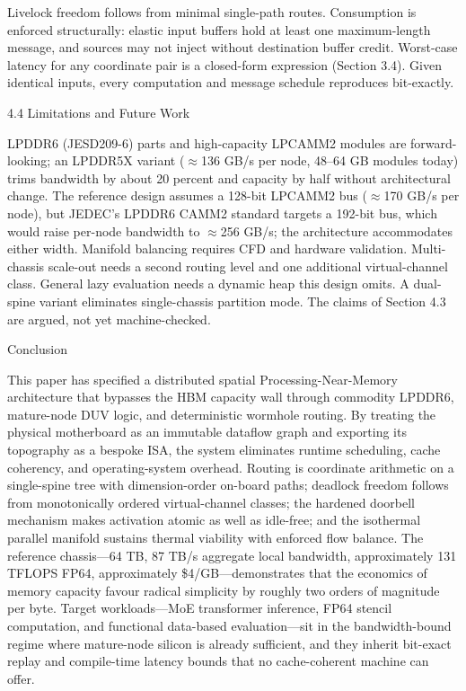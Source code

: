 \documentclass[10pt,twocolumn]{article}
\begin{document}
Livelock freedom follows from minimal single-path routes. Consumption is enforced structurally: elastic input buffers hold at least one maximum-length message, and sources may not inject without destination buffer credit. Worst-case latency for any coordinate pair is a closed-form expression (Section 3.4). Given identical inputs, every computation and message schedule reproduces bit-exactly.

4.4 Limitations and Future Work

LPDDR6 (JESD209-6)\cite{17} parts and high-capacity LPCAMM2 modules are forward-looking; an LPDDR5X variant ($\approx$136 GB/s per node, 48--64 GB modules today) trims bandwidth by about 20 percent and capacity by half without architectural change\cite{16,17}. The reference design assumes a 128-bit LPCAMM2 bus ($\approx$170 GB/s per node), but JEDEC's LPDDR6 CAMM2 standard targets a 192-bit bus, which would raise per-node bandwidth to $\approx$256 GB/s; the architecture accommodates either width. Manifold balancing requires CFD and hardware validation. Multi-chassis scale-out needs a second routing level and one additional virtual-channel class. General lazy evaluation needs a dynamic heap this design omits. A dual-spine variant eliminates single-chassis partition mode. The claims of Section 4.3 are argued, not yet machine-checked\cite{9}.

Conclusion

This paper has specified a distributed spatial Processing-Near-Memory architecture that bypasses the HBM capacity wall through commodity LPDDR6, mature-node DUV logic, and deterministic wormhole routing\cite{13,15,17}. By treating the physical motherboard as an immutable dataflow graph and exporting its topography as a bespoke ISA, the system eliminates runtime scheduling, cache coherency, and operating-system overhead. Routing is coordinate arithmetic on a single-spine tree with dimension-order on-board paths; deadlock freedom follows from monotonically ordered virtual-channel classes; the hardened doorbell mechanism makes activation atomic as well as idle-free; and the isothermal parallel manifold sustains thermal viability with enforced flow balance. The reference chassis---64 TB, 87 TB/s aggregate local bandwidth, approximately 131 TFLOPS FP64, approximately \$4/GB---demonstrates that the economics of memory capacity favour radical simplicity by roughly two orders of magnitude per byte. Target workloads---MoE transformer inference, FP64 stencil computation, and functional data-based evaluation---sit in the bandwidth-bound regime where mature-node silicon is already sufficient\cite{3,4,5}, and they inherit bit-exact replay and compile-time latency bounds that no cache-coherent machine can offer.
\end{document}
